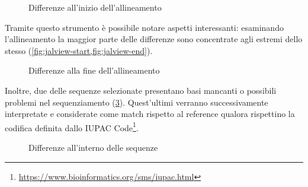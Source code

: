 \documentclass[11pt,italian]{article}
\begin{document}
\begin{figure}[H]
  \caption{Differenze all'inizio dell'allineamento}
  \label{fig:jalview-start}
\end{figure}

Tramite questo strumento è possibile notare aspetti interessanti: esaminando l'allineamento la maggior parte delle differenze sono concentrate agli estremi dello stesso (\cref{fig:jalview-start,fig:jalview-end}).

\begin{figure}[H]
  \caption{Differenze alla fine dell'allineamento}
  \label{fig:jalview-end}
\end{figure}

\vfill
Inoltre, due delle sequenze selezionate presentano basi mancanti o possibili problemi nel sequenziamento (\cref{fig:jalview-inner}).
Quest'ultimi verranno successivamente interpretate e considerate come match rispetto al reference qualora rispettino la codifica definita dallo IUPAC Code\footnote{\url{https://www.bioinformatics.org/sms/iupac.html}}.
\vfill

\begin{figure}[H]
  \caption{Differenze all'interno delle sequenze}
  \label{fig:jalview-inner}
\end{figure}
\end{document}
